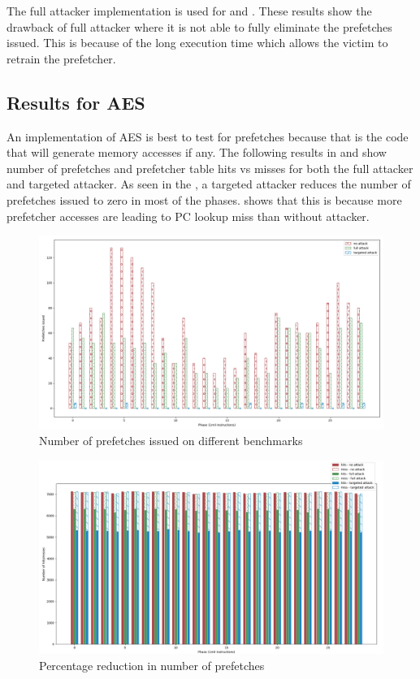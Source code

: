 The full attacker implementation is used for  and
.
These results show the drawback of full attacker where it is not able to
fully eliminate the prefetches issued. This is because of the long execution
time which allows the victim to retrain the prefetcher.

\subsection{Results for AES}

An implementation of AES is best to test for prefetches because that is the code
that will generate memory accesses if any. The following results
in  and  show
number of prefetches and prefetcher table hits vs misses for both
the full attacker and targeted attacker.
As seen in the , a targeted attacker
reduces the number of prefetches issued to zero in most of the phases.
 shows that this is because more
prefetcher accesses are leading to PC lookup miss than without attacker.

\begin{figure}[h]
    \centering
    \includegraphics[width=\textwidth]{figures/pf_issued}
    \caption{Number of prefetches issued on different benchmarks}
    \label{fig:targeted_attack}
\end{figure}

\begin{figure}[h]
    \centering
    \includegraphics[width=\textwidth]{figures/pf_hits}
    \caption{Percentage reduction in number of prefetches}
    \label{fig:targeted_hitrate}
\end{figure}

